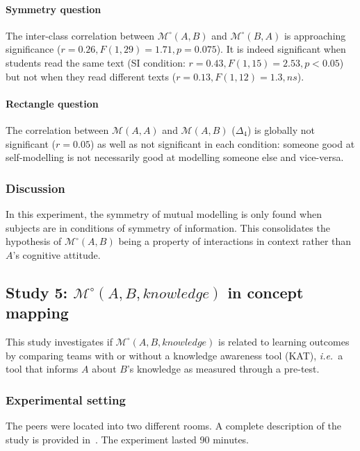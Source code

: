 \documentclass[natbib]{svjour3}
\newcommand{\ie}{{\textit{i.e.\ }}}
\newcommand{\gmodel}[2]{{$\mathcal{M}(#1, #2)$}}
\newcommand{\Model}[3]{{$\mathcal{M}^{\circ}(#1, #2, #3)$}}
\newcommand{\gModel}[2]{{$\mathcal{M}^{\circ}(#1, #2)$}}
\begin{document}
\paragraph{Symmetry question} The inter-class correlation between \gModel{A}{B}
and \gModel{B}{A} is approaching significance ($r= 0.26, F(1,29)=1.71, p=
0.075$). It is indeed significant when students read the same text (SI
condition: $r=0.43, F(1,15)=2.53, p<0.05$) but not when they read different texts
($r= 0.13, F(1,12)=1.3, ns$). 

\paragraph{Rectangle question} The correlation between \gmodel{A}{A}
and \gmodel{A}{B} ($\Delta_4$) is globally not significant ($r=0.05$) as well as not
significant in each condition: someone good at self-modelling is not necessarily
good at modelling someone else and vice-versa.

\subsubsection*{Discussion}

In this experiment, the symmetry of mutual modelling is only found when subjects
are in conditions of symmetry of information. This consolidates the hypothesis
of \gModel{A}{B} being a property of interactions in context rather than $A$'s
cognitive attitude.



\subsection{{\bf Study 5}: \Model{A}{B}{knowledge} in concept mapping}

This study investigates if \Model{A}{B}{knowledge} is related to learning
outcomes by comparing teams with or without a knowledge awareness tool (KAT),
\ie a tool that informs $A$ about $B$'s knowledge as measured through a pre-test.

\subsubsection*{Experimental setting}

The peers were located into two different rooms. A complete description of the
study is provided in~\citet{sangin2008learners}. The experiment lasted 90 minutes.
\end{document}
